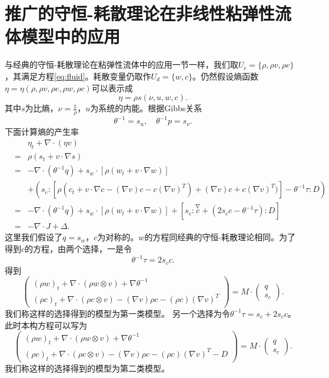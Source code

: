 \documentclass{article}
\begin{document}
\section{推广的守恒-耗散理论在非线性粘弹性流体模型中的应用}
与经典的守恒-耗散理论在粘弹性流体中的应用一节一样，我们取$U_c = \{ \rho,\rho v,\rho e\}$，其满足方程\eqref{eq:fluid}。耗散变量仍取作$U_d =\{ w,c\}$。仍然假设熵函数$\eta =\eta(\rho,\rho v,\rho e,\rho w,\rho c)$可以表示成
\begin{equation*}
	\eta = \rho s(\nu,u,w,c).
\end{equation*}
其中$s$为比熵，$\nu = \frac{1}{\rho}$，$u$为系统的内能。根据Gibbs关系
\begin{equation*}
		\theta^{-1} = s_u, \quad \theta^{-1} p = s_{\nu}.
\end{equation*}
下面计算熵的产生率
\begin{eqnarray*}
		&&\eta_t + \nabla \cdot (\eta v) \\
		&=& \rho (s_t + v \cdot \nabla s) \\
		&=& -\nabla \cdot (\theta^{-1} q) + s_w \cdot [\rho (w_t + v \cdot \nabla w)] \\
		&&+ (s_c:[\rho (c_t + v \cdot \nabla c - (\nabla v) c - c (\nabla v)^T) + (\nabla v) c + c (\nabla v)^T) ] - \theta^{-1} \tau : D) \\
		&=& -\nabla \cdot (\theta^{-1} q) + s_w \cdot [\rho (w_t + v \cdot \nabla w)] + [s_c:\stackrel{\nabla}{c} + (2 s_c c - \theta^{-1} \tau): D]   \\
		&=& -\nabla \cdot J + \Delta.
	\end{eqnarray*}	
	这里我们假设了$q=s_w$，$c$为对称的。$w$的方程同经典的守恒-耗散理论相同。为了得到$c$的方程，由两个选择，一是令
	\begin{equation*}
		\theta^{-1} \tau = 2 s_c c.
	\end{equation*}
	得到
	\begin{equation} \label{eq:ECDFgeneral1}
		\left( \begin{array}{c} 
			(\rho w)_t +  \nabla \cdot (\rho w \otimes v)  + \nabla \theta^{-1} \\
			(\rho c)_t +  \nabla \cdot (\rho c \otimes v) - (\nabla v) \rho c - (\rho c) (\nabla v)^T 
		\end{array} \right) = M \cdot
		\left( \begin{array}{c} 
			q \\ s_c
		\end{array}\right).
	\end{equation}
	我们称这样的选择得到的模型为第一类模型。
	另一个选择为令$\theta^{-1} \tau = s_c + 2 s_c c$。此时本构方程可以写为
	\begin{equation}
	\left( \begin{array}{c} 
			(\rho w)_t +  \nabla \cdot (\rho w \otimes v)  + \nabla \theta^{-1} \\
			(\rho c)_t +  \nabla \cdot (\rho c \otimes v) - (\nabla v) \rho c - (\rho c) (\nabla v)^T - D 
		\end{array} \right) = M \cdot
		\left( \begin{array}{c} 
			q \\ s_c
		\end{array}\right).	
	\end{equation}
	我们称这样的选择得到的模型为第二类模型。
\end{document}
